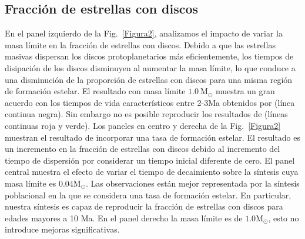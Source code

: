 \documentclass[baaa]{baaa}
\begin{document}
\subsection{Fracción de estrellas con discos}

En el panel izquierdo de la Fig.~\ref{Figura2}, analizamos el impacto de variar la masa l\'imite en la fracción de estrellas con discos. Debido a que las estrellas masivas dispersan los discos protoplanetarios m\'as eficientemente, los tiempos de disipación de los discos disminuyen al aumentar la masa l\'imite, lo que conduce a una disminución de la proporción de estrellas con discos para una misma región de formación estelar. El  resultado con masa l\'imite $1.0~\mathrm{M}_{\odot}$  muestra un gran acuerdo con los tiempos de vida característicos entre 2-3Ma obtenidos por \cite{MamajekE} (línea continua negra). Sin embargo no es posible reproducir los resultados de \cite{Pfalzner_2022} (líneas continuas roja y verde). Los paneles en centro y derecha de la Fig.~\ref{Figura2} muestran el resultado de incorporar una tasa de formación estelar. El resultado es un incremento en la fracción de estrellas con discos debido al incremento del tiempo de dispersión por considerar un tiempo inicial diferente de cero. 
El panel central muestra el efecto de variar el tiempo de decaimiento sobre la s\'intesis cuya masa l\'imite es $0.04\mathrm{M}_{\odot}$. 
Las observaciones están mejor representada por la síntesis poblacional en la que se considera una tasa de formación estelar. En particular, nuestra síntesis es capaz de reproducir la fracción de estrellas con discos para edades mayores a 10 Ma. En el panel derecho la masa l\'imite es de $1.0\mathrm{M}_{\odot}$, esto no introduce mejoras significativas.
\end{document}
